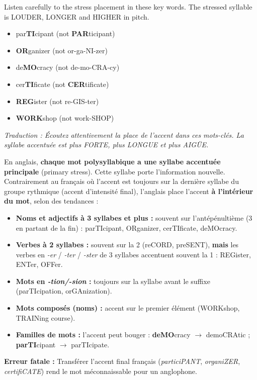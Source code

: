 \documentclass[11pt]{article}
\newcommand{\cle}[1]{{\popxbold\color{popdark}#1}}
\begin{document}
\begin{textebox}
Listen carefully to the stress placement in these key words. The stressed syllable is LOUDER, LONGER and HIGHER in pitch.
\begin{itemize}
    \item par\textbf{TI}cipant (not \textbf{PAR}ticipant)
    \item \textbf{OR}ganizer (not or-ga-NI-zer)
    \item de\textbf{MO}cracy (not de-mo-CRA-cy)
    \item cer\textbf{TI}ficate (not \textbf{CER}tificate)
    \item \textbf{REG}ister (not re-GIS-ter)
    \item \textbf{WORK}shop (not work-SHOP)
\end{itemize}
\textit{Traduction : Écoutez attentivement la place de l'accent dans ces mots-clés. La syllabe accentuée est plus FORTE, plus LONGUE et plus AIGÜE.}
\end{textebox}

\begin{propriete}
En anglais, \textbf{chaque mot polysyllabique a une syllabe accentuée principale} (primary stress). Cette syllabe porte l'information nouvelle. Contrairement au français où l'accent est toujours sur la dernière syllabe du groupe rythmique (accent d'intensité final), l'anglais place l'accent \textbf{à l'intérieur du mot}, selon des tendances :
\begin{itemize}
    \item \textbf{Noms et adjectifs à 3 syllabes et plus :} souvent sur l'antépénultième (3 en partant de la fin) : \cle{parTIcipant}, \cle{ORganizer}, \cle{cerTIficate}, \cle{deMOcracy}.
    \item \textbf{Verbes à 2 syllabes :} souvent sur la 2 (re\cle{CORD}, pre\cle{SENT}), \textbf{mais} les verbes en \textit{-er} / \textit{-ter} / \textit{-ster} de 3 syllabes accentuent souvent la 1 : \cle{REGister}, \cle{ENTer}, \cle{OFFer}.
    \item \textbf{Mots en \textit{-tion/-sion} :} toujours sur la syllabe avant le suffixe (par\cle{TI}cipation, or\cle{GA}ni\cle{za}tion).
    \item \textbf{Mots composés (noms) :} accent sur le premier élément (\cle{WORK}shop, \cle{TRAIN}ing course).
    \item \textbf{Familles de mots :} l'accent peut bouger : \textbf{deMO}cracy $\to$ demo\cle{CRA}tic ; \textbf{parTI}cipant $\to$ par\cle{TI}cipate.
\end{itemize}
\textbf{Erreur fatale :} Transférer l'accent final français (\textit{partici\cle{PANT}}, \textit{organi\cle{ZER}}, \textit{certifi\cle{CATE}}) rend le mot méconnaissable pour un anglophone.
\end{propriete}
\end{document}
